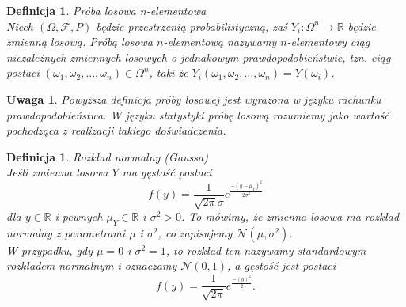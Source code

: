 \documentclass[12pt,a4paper]{report}
\newtheorem{definition}[theorem]{Definicja}
\newtheorem{uwaga}{Uwaga}
\begin{document}
\begin{definition}{Próba losowa n-elementowa \cite[Rozdział 2]{bartoszewicz1996}}\\
Niech $(\Omega, \mathcal{F}, P)$ będzie przestrzenią probabilistyczną, zaś $Y_{i}:\Omega^{n}  \rightarrow \mathbb{R}$ będzie zmienną losową.  
Próbą losowa $n$-elementową nazywamy $n$-elementowy ciąg niezależnych zmiennych losowych o jednakowym prawdopodobieństwie, tzn. ciąg postaci $(\omega_{1}, \omega_{2}, \ldots, \omega_{n}) \in \Omega^{n}$, taki że $Y_{i}(\omega_{1}, \omega_{2}, \ldots, \omega_{n})=Y(\omega_{i})$.
\end{definition}


\begin{uwaga}
Powyższa definicja próby losowej jest wyrażona w języku rachunku prawdopodobieństwa. W języku statystyki próbę losową rozumiemy jako wartość pochodząca z realizacji takiego doświadczenia.
\end{uwaga}



\begin{definition}{Rozkład normalny (Gaussa) \cite[Rozdział 5.10]{jakubowski2004}}\\
Jeśli zmienna losowa $Y$ ma gęstość postaci
$$
f(y)=\frac{1}{\sqrt{2\pi}\sigma}e^\frac{-(y-\mu_Y)^2}{2\sigma^2}
$$ 
dla $y \in \mathbb{R}$ i pewnych $\mu_Y \in \mathbb{R}$ i $\sigma^2 >0$. To mówimy, że zmienna losowa ma rozkład normalny z parametrami $\mu$ i $\sigma^2$, co zapisujemy $\mathcal{N}(\mu, \sigma^2)$.\\
W przypadku, gdy $\mu=0$ i $\sigma^2=1$, to rozkład ten nazywamy standardowym rozkładem normalnym i oznaczamy $\mathcal{N}(0,1)$, a gęstość jest postaci
$$f(y)=\frac{1}{\sqrt{2\pi}}e^\frac{-(y)^2}{2}.$$ 
\end{definition}


\end{document}
